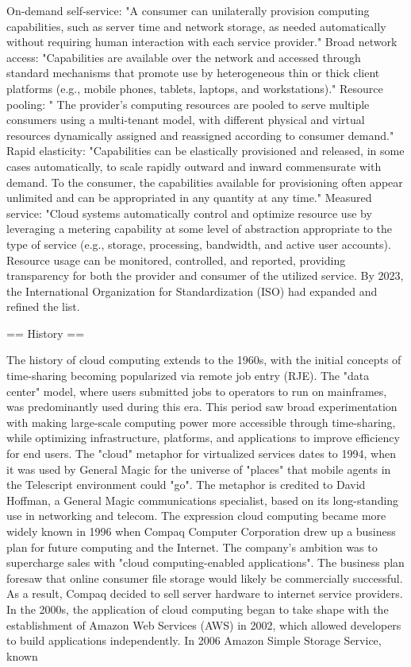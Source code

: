 \documentclass[12pt,a4paper]{report}
\begin{document}
On-demand self-service: "A consumer can unilaterally provision computing capabilities, such as server time and network storage, as needed automatically without requiring human interaction with each service provider."
Broad network access: "Capabilities are available over the network and accessed through standard mechanisms that promote use by heterogeneous thin or thick client platforms (e.g., mobile phones, tablets, laptops, and workstations)."
Resource pooling: " The provider's computing resources are pooled to serve multiple consumers using a multi-tenant model, with different physical and virtual resources dynamically assigned and reassigned according to consumer demand."
Rapid elasticity: "Capabilities can be elastically provisioned and released, in some cases automatically, to scale rapidly outward and inward commensurate with demand. To the consumer, the capabilities available for provisioning often appear unlimited and can be appropriated in any quantity at any time."
Measured service: "Cloud systems automatically control and optimize resource use by leveraging a metering capability at some level of abstraction appropriate to the type of service (e.g., storage, processing, bandwidth, and active user accounts). Resource usage can be monitored, controlled, and reported, providing transparency for both the provider and consumer of the utilized service.
By 2023, the International Organization for Standardization (ISO) had expanded and refined the list.


== History ==

The history of cloud computing extends to the 1960s, with the initial concepts of time-sharing becoming popularized via remote job entry (RJE). The "data center" model, where users submitted jobs to operators to run on mainframes, was predominantly used during this era. This period saw broad experimentation with making large-scale computing power more accessible through time-sharing, while optimizing infrastructure, platforms, and applications to improve efficiency for end users.
The "cloud" metaphor for virtualized services dates to 1994, when it was used by General Magic for the universe of "places" that mobile agents in the Telescript environment could "go". The metaphor is credited to David Hoffman, a General Magic communications specialist, based on its long-standing use in networking and telecom. The expression cloud computing became more widely known in 1996 when Compaq Computer Corporation drew up a business plan for future computing and the Internet. The company's ambition was to supercharge sales with "cloud computing-enabled applications". The business plan foresaw that online consumer file storage would likely be commercially successful. As a result, Compaq decided to sell server hardware to internet service providers.
In the 2000s, the application of cloud computing began to take shape with the establishment of Amazon Web Services (AWS) in 2002, which allowed developers to build applications independently. In 2006 Amazon Simple Storage Service, known
\end{document}
